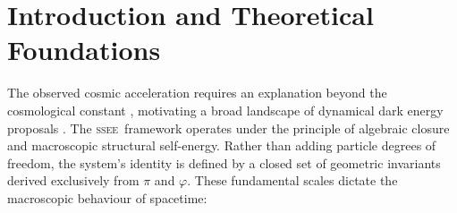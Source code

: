 \documentclass[12pt,a4paper]{article}
\newcommand{\SSEE}{\ifmmode\mathrm{SSEE}\else\textsc{ssee}\fi}
\begin{document}
\begin{abstract}
Probe by probe, with the background of both models fixed in advance, SSEE matches $\Lambda$CDM within $|\Delta\chi^2|\le\val{sondas_max_empate}$ in $\val{sondas_n_empatan}$ of $\val{sondas_n}$ comparisons---the supernova compilations, ACT and SPT CMB lensing, DES~Y3, Planck and KiDS-Legacy---even where $\Lambda$CDM fits up to $\val{sondas_max_k_lcdm}$ parameters against SSEE's $\{A_s,\tau\}$, and BOSS full-shape gives $\Delta\chi^2=\val{bossC_dchi2_ssee_libre}$ with SSEE fully fixed against $\Lambda$CDM with its cosmology free; DESI~DR2 BAO is the only probe that separates the two models, by $\Delta\chi^2=\val{sondas_desi_clavado}$ in favour of SSEE.
The framework is falsifiable: a B-mode polarisation tensor-to-scalar ratio
$r = \varphi^{-10} = \val{R_TENSOR_d6}$ is predicted for LiteBIRD \citep{LiteBIRD2023} ($\sim$2032).
\end{abstract}

\clearpage
{\small\tableofcontents}
\clearpage

\section{Introduction and Theoretical Foundations}
\label{sec:intro}

The observed cosmic acceleration \citep{Perlmutter1999,Riess1998} requires an
explanation beyond the cosmological constant \citep{Weinberg1989}, motivating a broad
landscape of dynamical dark energy proposals
\citep{RatraPeebles1988,Copeland2006,Weinberg2013review,Clifton2012}.
The \SSEE\ framework operates under the principle of algebraic closure and macroscopic
structural self-energy. Rather than adding particle degrees of freedom, the system's
identity is defined by a closed set of geometric invariants derived exclusively from
$\pi$ and $\varphi$. These fundamental scales dictate the macroscopic behaviour of spacetime:
\end{document}
